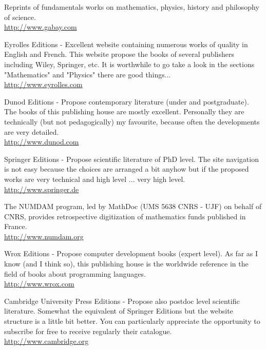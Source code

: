 	{\Large {}}{\Large {}}{\Large {}}{\Large {}}\bcdfrance{} Reprints of fundamentals works on mathematics, physics, history and philosophy of science.\\
	\href{http://www.gabay.com}{\color{blue}http://www.gabay.com}
	
	\pagebreak
	{\Large {}}{\Large {}}{\Large {}}{\Large {}}\bcdfrance{} Eyrolles Editions - Excellent website containing numerous works of quality in English and French. This website propose the books of several publishers including Wiley, Springer, etc. It is worthwhile to go take a look in the sections "Mathematics" and "Physics" there are good things... \\
	\href{http://www.eyrolles.com}{\color{blue}http://www.eyrolles.com}
	
	{\Large {}}{\Large {}}{\Large {}}{\Large {}}\bcdfrance{} Dunod Editions - Propose contemporary literature (under and postgraduate). The books of this publishing house are mostly excellent. Personally they are technically (but not pedagogically) my favourite, because often the developments are very detailed.\\
	\href{http://www.dunod.com}{\color{blue}http://www.dunod.com}
	
	{\Large {}}{\Large {}} Springer Editions - Propose scientific literature of PhD level. The site navigation is not easy because the choices are arranged a bit anyhow but if the proposed works are very technical and high level ... very high level.\\
	\href{http://www.springer.de}{\color{blue}http://www.springer.de}
	
	{\Large {}}{\Large {}}{\Large {}}\bcdfrance{} The NUMDAM program, led by MathDoc (UMS 5638 CNRS - UJF) on behalf of CNRS, provides retrospective digitization of mathematics funds published in France.\\
	\href{http://www.numdam.org}{\color{blue}http://www.numdam.org}
	
	{\Large {}}{\Large {}}{\Large {}}{\Large {}} Wrox Editions - Propose computer development books (expert level). As far as I know (and I think so), this publishing house is the worldwide reference in the field of books about programming languages.\\
	\href{http://www.wrox.com}{\color{blue}http://www.wrox.com}
	
	{\Large {}}{\Large {}}{\Large {}} Cambridge University Press Editions - Propose also postdoc level scientific literature. Somewhat the equivalent of Springer Editions but the website structure is a little bit better. You can particularly appreciate the opportunity to subscribe for free to receive regularly their catalogue.\\
	\href{http://www.cambridge.org}{\color{blue}http://www.cambridge.org}
	
